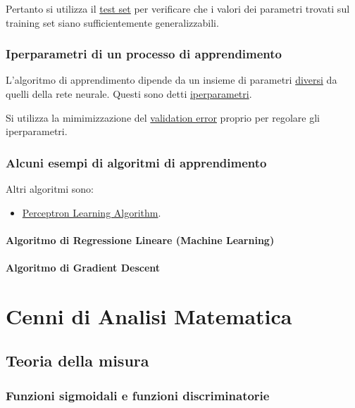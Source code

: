 \documentclass[10pt]{book}
\newcommand{\1}{\mathds{1}}
\theoremstyle{definition}%
\theoremstyle{plain}
\theoremstyle{remark}
\begin{document}
Pertanto si utilizza il \uline{test set} per verificare che i valori dei parametri trovati sul training set siano sufficientemente generalizzabili.
\subsection{Iperparametri di un processo di apprendimento}
\label{sec:orgead180c}
L'algoritmo di apprendimento dipende da un insieme di parametri \uline{diversi} da quelli della rete neurale. Questi sono detti \uline{iperparametri}.

Si utilizza la mimimizzazione del \uline{validation error} proprio per regolare gli iperparametri.
\subsection{Alcuni esempi di algoritmi di apprendimento}
\label{sec:orgeb067c7}

Altri algoritmi sono:
\begin{itemize}
\item \hyperref[sec:orgede799b]{Perceptron Learning Algorithm}.
\end{itemize}
\subsubsection{Algoritmo di Regressione Lineare (Machine Learning)}
\label{sec:org446ef11}
\subsubsection{Algoritmo di Gradient Descent}
\label{sec:orga428cd0}
\chapter{Cenni di Analisi Matematica}
\label{sec:org97e690c}

\section{Teoria della misura}
\label{sec:org7b7a007}

\subsection{Funzioni sigmoidali e funzioni discriminatorie}
\label{sec:org6f95d7a}
\end{document}
